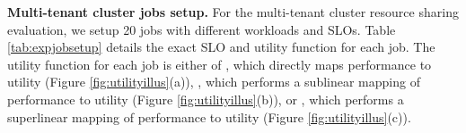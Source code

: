 \textbf{Multi-tenant cluster jobs setup.} For the multi-tenant cluster resource sharing evaluation, we setup 20 jobs with different workloads and SLOs. Table \ref{tab:expjobsetup} details the exact SLO and utility function for each job.  The utility function for each job is either of , which directly maps performance to utility (Figure \ref{fig:utilityillus}(a)), , which performs a sublinear mapping of performance to utility (Figure \ref{fig:utilityillus}(b)), or , which performs a superlinear mapping of performance to utility (Figure \ref{fig:utilityillus}(c)).
\insertExpSetupTable







